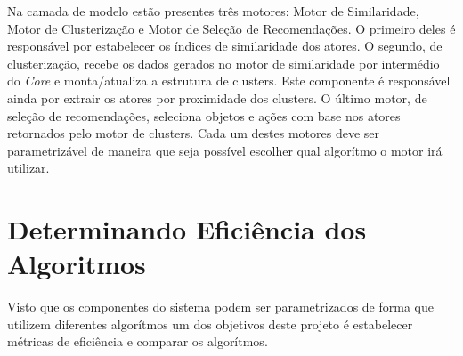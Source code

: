 \documentclass[
	12pt,				%
    oneside,			%
	a4paper,			%
	english,			%
	french,				%
	spanish,			%
	brazil,				%
	]{abntex2}
\begin{document}
Na camada de modelo estão presentes três motores: Motor de Similaridade, Motor de Clusterização e Motor de Seleção de Recomendações. O primeiro deles é responsável por estabelecer os índices de similaridade dos atores. O segundo, de 
clusterização, recebe os dados gerados no motor de similaridade por intermédio do \textit{Core} e monta/atualiza a estrutura de clusters. Este componente é responsável ainda por extrair os atores por proximidade dos clusters. O último
motor, de seleção de recomendações, seleciona objetos e ações com base nos atores retornados pelo motor de clusters. Cada um destes motores deve ser parametrizável de maneira que seja possível escolher qual algorítmo o motor irá utilizar.

\section{Determinando Eficiência dos Algoritmos}
Visto que os componentes do sistema podem ser parametrizados de forma que utilizem diferentes algorítmos um dos objetivos deste projeto é estabelecer métricas de eficiência e comparar os algorítmos.
\end{document}
